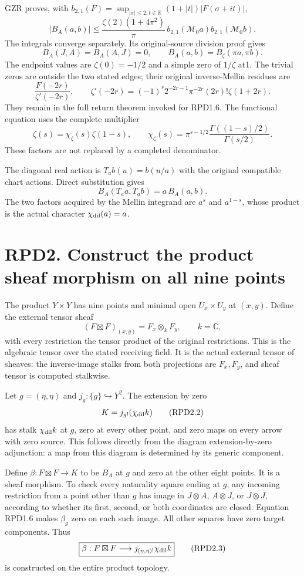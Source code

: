 GZR proves, with
\(b_{2,1}(F)=\sup_{|\sigma|\le2,t\in\mathbb R}(1+|t|)|F(\sigma+it)|\),
\[
|B_A(a,b)|\le
\frac{\zeta(2)(1+4\pi^2)}{\pi}\,
b_{2,1}(\mathcal M_0a)b_{2,1}(\mathcal M_0b).
\tag{RPD1.5}
\] The integrals converge separately. Its original-source division proof
gives \[
B_A(J,A)=B_A(A,J)=0,\qquad
B_A(a,b)=B_\zeta(\pi a,\pi b).
\tag{RPD1.6}
\] The endpoint values are \(\zeta(0)=-1/2\) and a simple zero of
\(1/\zeta\) at1. The trivial zeros are outside the two stated edges;
their original inverse-Mellin residues are \[
\frac{F(-2r)}{\zeta'(-2r)},\qquad
\zeta'(-2r)=(-1)^r2^{-2r-1}\pi^{-2r}(2r)!\zeta(1+2r).
\tag{RPD1.7}
\] They remain in the full return theorem invoked for RPD1.6. The
functional equation uses the complete multiplier \[
\zeta(s)=\chi_\zeta(s)\zeta(1-s),\qquad
\chi_\zeta(s)=\pi^{s-1/2}
\frac{\Gamma((1-s)/2)}{\Gamma(s/2)}.
\tag{RPD1.8}
\] These factors are not replaced by a completed denominator.

The diagonal real action is \(T_ab(u)=b(u/a)\) with the original
compatible chart actions. Direct substitution gives \[
B_A(T_aa,T_ab)=a\,B_A(a,b).
\tag{RPD1.9}
\] The two factors acquired by the Mellin integrand are \(a^s\) and
\(a^{1-s}\), whose product is the actual character
\(\chi_{\rm dil}(a)=a\).

\section{RPD2. Construct the product sheaf morphism on all nine
points}\label{rpd2.-construct-the-product-sheaf-morphism-on-all-nine-points}

The product \(Y\times Y\) has nine points and minimal open
\(U_x\times U_y\) at \((x,y)\). Define the external tensor sheaf \[
(F\boxtimes F)_{(x,y)}=F_x\otimes_kF_y,\qquad k=\mathbb C,
\tag{RPD2.1}
\] with every restriction the tensor product of the original
restrictions. This is the algebraic tensor over the stated receiving
field. It is the actual external tensor of sheaves: the inverse-image
stalks from both projections are \(F_x,F_y\), and sheaf tensor is
computed stalkwise.

Let \(g=(\eta,\eta)\) and \(j_g:\{g\}\hookrightarrow Y^2\). The
extension by zero \[
K=j_{g!}(\chi_{\rm dil}k)
\tag{RPD2.2}
\] has stalk \(\chi_{\rm dil}k\) at \(g\), zero at every other point,
and zero maps on every arrow with zero source. This follows directly
from the diagram extension-by-zero adjunction: a map from this diagram
is determined by its generic component.

Define \(\beta:F\boxtimes F\to K\) to be \(B_A\) at \(g\) and zero at
the other eight points. It is a sheaf morphism. To check every
naturality square ending at \(g\), any incoming restriction from a point
other than \(g\) has image in \(J\otimes A\), \(A\otimes J\), or
\(J\otimes J\), according to whether its first, second, or both
coordinates are closed. Equation RPD1.6 makes \(\beta_g\) zero on each
such image. All other squares have zero target components. Thus \[
\boxed{\beta:F\boxtimes F\longrightarrow j_{(\eta,\eta)!}\chi_{\rm dil}k}
\tag{RPD2.3}
\] is constructed on the entire product topology.

